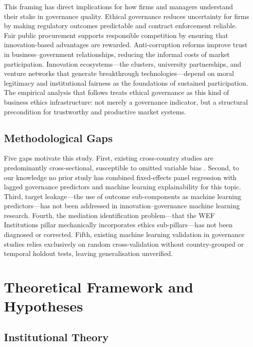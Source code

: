 \documentclass[pdflatex,sn-apa]{sn-jnl}
\begin{document}
This framing has direct implications for how firms and managers understand their stake in governance quality. Ethical governance reduces uncertainty for firms by making regulatory outcomes predictable and contract enforcement reliable. Fair public procurement supports responsible competition by ensuring that innovation-based advantages are rewarded. Anti-corruption reforms improve trust in business--government relationships, reducing the informal costs of market participation. Innovation ecosystems---the clusters, university partnerships, and venture networks that generate breakthrough technologies---depend on moral legitimacy and institutional fairness as the foundations of sustained participation. The empirical analysis that follows treats ethical governance as this kind of business ethics infrastructure: not merely a governance indicator, but a structural precondition for trustworthy and productive market systems.

\subsection{Methodological Gaps}

Five gaps motivate this study. First, existing cross-country studies are predominantly cross-sectional, susceptible to omitted variable bias \citep{mauro1995,meon2005}. Second, to our knowledge no prior study has combined fixed-effects panel regression with lagged governance predictors and machine learning explainability for this topic. Third, target leakage---the use of outcome sub-components as machine learning predictors---has not been addressed in innovation--governance machine learning research. Fourth, the mediation identification problem---that the WEF Institutions pillar mechanically incorporates ethics sub-pillars---has not been diagnosed or corrected. Fifth, existing machine learning validation in governance studies relies exclusively on random cross-validation without country-grouped or temporal holdout tests, leaving generalisation unverified.

\section{Theoretical Framework and Hypotheses}
\label{sec:framework}

\subsection{Institutional Theory}
\end{document}
